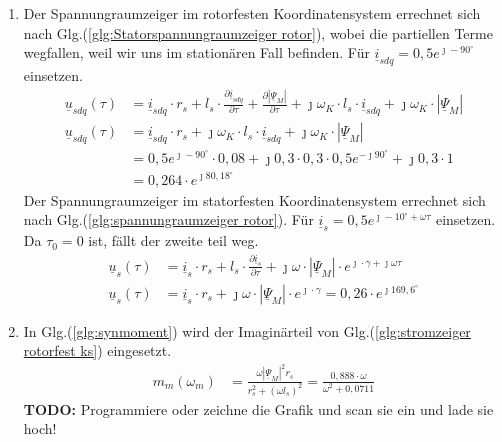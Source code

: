 \begin{solution}
\begin{enumerate}
\item Der Spannungraumzeiger im rotorfesten Koordinatensystem errechnet sich nach Glg.(\ref{glg:Statorspannungraumzeiger rotor}), wobei die partiellen Terme wegfallen, weil wir uns im stationären Fall befinden. Für $\underline{i}_{sdq}= 0,5 e^{\jmath -90^\circ}$ einsetzen.
\begin{align}
\underline{u}_{sdq}(\tau) &= \underline{i}_{sdq} \cdot r_s + l_s \cdot \frac{\partial \underline{i}_{sdq}}{\partial \tau} + \frac{\partial |\underline{\Psi}_M|}{\partial \tau} + \jmath \omega_K \cdot l_s \cdot \underline{i}_{sdq} + \jmath \omega_K \cdot |\underline{\Psi}_M|\\
\underline{u}_{sdq}(\tau) &= \underline{i}_{sdq} \cdot r_s + \jmath \omega_K \cdot l_s \cdot \underline{i}_{sdq} + \jmath \omega_K \cdot |\underline{\Psi}_M|\\
&= 0,5 e^{\jmath -90^\circ} \cdot 0,08 + \jmath 0,3 \cdot 0,3 \cdot 0,5 e^{-\jmath 90^\circ}+\jmath 0,3 \cdot 1\\
&=0,264 \cdot e^{\jmath 80,18^\circ}
\end{align}
Der Spannungraumzeiger im statorfesten Koordinatensystem errechnet sich nach Glg.(\ref{glg:spannungraumzeiger rotor}). Für $\underline{i}_{s}= 0,5 e^{\jmath -10^\circ+\omega \tau}$ einsetzen. Da $\tau_0 = 0$ ist, fällt der zweite teil weg.
\begin{align}
\underline{u}_s(\tau) &= \underline{i}_s \cdot r_s + l_s \cdot \frac{\partial \underline{i}_s}{\partial \tau} + \jmath\omega \cdot|\underline{\Psi}_M | \cdot e^{\jmath \cdot \gamma + \jmath \omega \tau}\\
\underline{u}_s(\tau) &= \underline{i}_s \cdot r_s + \jmath\omega \cdot|\underline{\Psi}_M | \cdot e^{\jmath \cdot \gamma}=0,26\cdot e^{\jmath 169,6^\circ}
\end{align}
\item In Glg.(\ref{glg:synmoment}) wird der Imaginärteil von Glg.(\ref{glg:stromzeiger rotorfest ks}) eingesetzt.
\begin{align}
m_m(\omega_m) &= \frac{\omega |\underline{\Psi}_M|^2 r_s}{r_s^2 + (\omega l_s)^2}=\frac{0,888 \cdot \omega}{\omega^2 + 0,0711}
\end{align}
\textbf{TODO:} Programmiere oder zeichne die Grafik und scan sie ein und lade sie hoch!
\end{enumerate}
\end{solution}